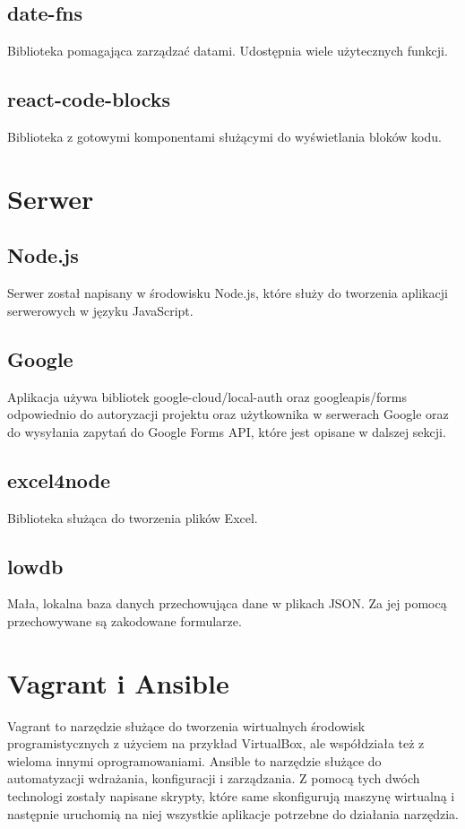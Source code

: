 \subsection{date-fns}
Biblioteka pomagająca zarządzać datami. Udostępnia wiele użytecznych funkcji.

\subsection{react-code-blocks}
Biblioteka z gotowymi komponentami służącymi do wyświetlania bloków kodu.

\section{Serwer}

\subsection{Node.js}
Serwer został napisany w środowisku Node.js, które służy do tworzenia aplikacji
serwerowych w języku JavaScript.

\subsection{Google}
Aplikacja używa bibliotek google-cloud/local-auth oraz googleapis/forms
odpowiednio do autoryzacji projektu oraz użytkownika w serwerach Google 
oraz do wysyłania zapytań do Google Forms API, które jest opisane w dalszej sekcji.

\subsection{excel4node}
Biblioteka służąca do tworzenia plików Excel.

\subsection{lowdb}
Mała, lokalna baza danych przechowująca dane w plikach JSON. Za jej pomocą
przechowywane są zakodowane formularze.

\section{Vagrant i Ansible}
Vagrant to narzędzie służące do tworzenia wirtualnych środowisk programistycznych
z użyciem na przykład VirtualBox, ale współdziała też z wieloma innymi oprogramowaniami.
Ansible to narzędzie służące do automatyzacji
wdrażania, konfiguracji i zarządzania. Z pomocą tych dwóch technologi zostały
napisane skrypty, które same skonfigurują maszynę wirtualną i następnie uruchomią
na niej wszystkie aplikacje potrzebne do działania narzędzia. 

